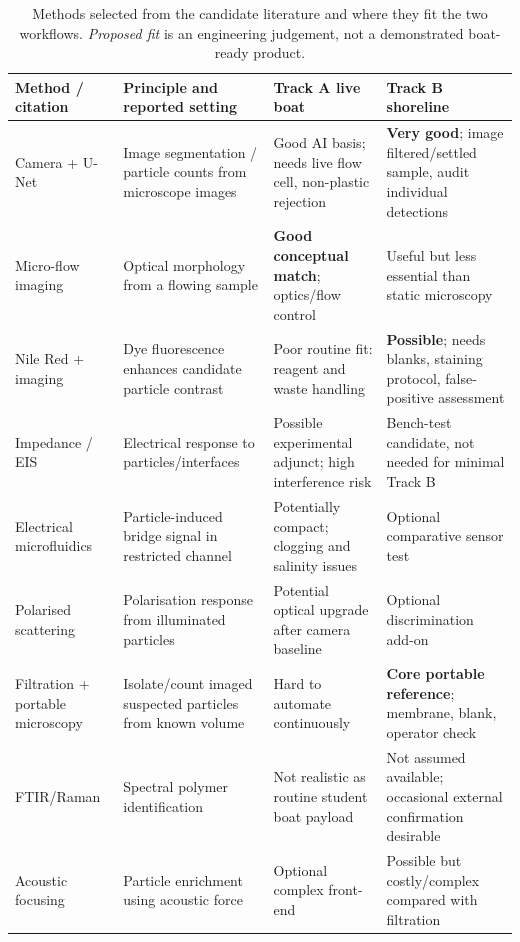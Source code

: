 \documentclass[10pt,a4paper]{article}
\begin{document}
\begin{table}[H]\centering\footnotesize
\caption{Methods selected from the candidate literature and where they fit the two workflows. \emph{Proposed fit} is an engineering judgement, not a demonstrated boat-ready product.}\label{tab:methods}
\begin{tabularx}{\linewidth}{@{}p{2.45cm}p{2.75cm}X X@{}}\toprule
Method / citation & Principle and reported setting & Track A live boat & Track B shoreline \\\midrule
Camera + U-Net \cite{Lee2022,UrbanCNN2024} & Image segmentation / particle counts from microscope images & Good AI basis; needs live flow cell, non-plastic rejection & \textbf{Very good}; image filtered/settled sample, audit individual detections \\
Micro-flow imaging \cite{Microflow2023} & Optical morphology from a flowing sample & \textbf{Good conceptual match}; optics/flow control & Useful but less essential than static microscopy \\
Nile Red + imaging \cite{ErniCassola2017,Minor2023} & Dye fluorescence enhances candidate particle contrast & Poor routine fit: reagent and waste handling & \textbf{Possible}; needs blanks, staining protocol, false-positive assessment \\
Impedance / EIS \cite{Blevins2021,Kim2024} & Electrical response to particles/interfaces & Possible experimental adjunct; high interference risk & Bench-test candidate, not needed for minimal Track B \\
Electrical microfluidics \cite{Warraich2025} & Particle-induced bridge signal in restricted channel & Potentially compact; clogging and salinity issues & Optional comparative sensor test \\
Polarised scattering \cite{Polarized2021} & Polarisation response from illuminated particles & Potential optical upgrade after camera baseline & Optional discrimination add-on \\
Filtration + portable microscopy \cite{Ermolin2024,MPWE00012} & Isolate/count imaged suspected particles from known volume & Hard to automate continuously & \textbf{Core portable reference}; membrane, blank, operator check \\
FTIR/Raman \cite{Sefiloglu2024,MPWE00012} & Spectral polymer identification & Not realistic as routine student boat payload & Not assumed available; occasional external confirmation desirable \\
Acoustic focusing \cite{Ohori2025} & Particle enrichment using acoustic force & Optional complex front-end & Possible but costly/complex compared with filtration \\
\bottomrule\end{tabularx}
\end{table}
\end{document}
